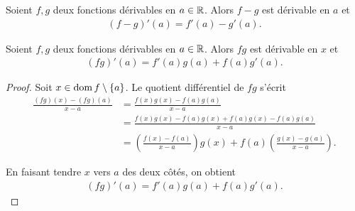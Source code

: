 \documentclass[main.tex]{subfiles}
\begin{document}
\begin{proposition}

    Soient $f, g$ deux fonctions dérivables en $a \in \mathbb{R}$.
    Alors $f - g$ est dérivable en $a$ et
    \begin{align}
        (f - g)'(a) = f'(a) - g'(a).
    \end{align}
\end{proposition}

\begin{proposition}

    Soient $f, g$ deux fonctions dérivables en $a \in \mathbb{R}$.
    Alors $f g$ est dérivable en $x$ et
    \begin{align}
        (f g)'(a) = f'(a) g(a) + f(a) g'(a).
    \end{align}
\end{proposition}
\begin{proof}
    Soit $x \in \operatorname{dom} f \setminus \{a\}$.
    Le quotient différentiel de $f g$ s'écrit
    \begin{align}
        \frac {(f g)(x) - (f g)(a)} {x - a}
        &= \frac {f(x) g(x) - f(a) g(a)} {x - a}\\
        &= \frac {f(x) g(x) - f(a) g(x) + f(a) g(x) - f(a) g(a)} {x - a}\\
        &= \left(\frac {f(x) - f(a)} {x - a}\right) g(x) + f(a) \left(\frac {g(x) - g(a)} {x - a}\right).
    \end{align}

    En faisant tendre $x$ vers $a$ des deux côtés,
    on obtient
    \begin{align}
        (f g)'(a) = f'(a) g(a) + f(a) g'(a).
    \end{align}
\end{proof}
\end{document}
